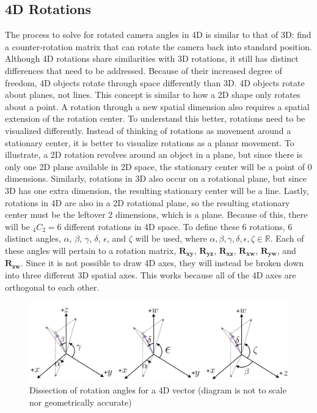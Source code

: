 \documentclass[12pt, letterpaper]{article}
\begin{document}
\subsection{4D Rotations}
The process to solve for rotated camera angles in 4D is similar to that of 3D: find a counter-rotation matrix that can rotate the camera back into standard position. Although 4D rotations share similarities with 3D rotations, it still has distinct differences that need to be addressed. Because of their increased degree of freedom, 4D objects rotate through space differently than 3D. 4D objects rotate about planes, not lines. This concept is similar to how a 2D shape only rotates about a point. A rotation through a new spatial dimension also requires a spatial extension of the rotation center. To understand this better, rotations need to be visualized differently. Instead of thinking of rotations as movement around a stationary center, it is better to visualize rotations as a planar movement. To illustrate, a 2D rotation revolves around an object in a plane, but since there is only one 2D plane available in 2D space, the stationary center will be a point of 0 dimensions. Similarly, rotations in 3D also occur on a rotational plane, but since 3D has one extra dimension, the resulting stationary center will be a line. Lastly, rotations in 4D are also in a 2D rotational plane, so the resulting stationary center must be the leftover 2 dimensions, which is a plane. Because of this, there will be ${}_{4}C_{2} = 6$ different rotations in 4D space. To define these 6 rotations, 6 distinct angles, $\alpha$, $\beta$, $\gamma$, $\delta$, $\epsilon$, and $\zeta$ will be used, where $\alpha, \beta, \gamma, \delta, \epsilon, \zeta \in \mathbb{R}$. Each of these angles will pertain to a rotation matrix, $\mathbf{R_{xy}}$, $\mathbf{R_{yz}}$, $\mathbf{R_{xz}}$, $\mathbf{R_{xw}}$, $\mathbf{R_{yw}}$, and $\mathbf{R_{zw}}$. Since it is not possible to draw 4D axes, they will instead be broken down into three different 3D spatial axes. This works because all of the 4D axes are orthogonal to each other.
\begin{figure}[H]
\centering
\includegraphics[width=17cm]{4d_angles.png}
\caption{Dissection of rotation angles for a 4D vector (diagram is not to scale nor geometrically accurate)}
\label{fig:figure}
\end{figure}
\end{document}
